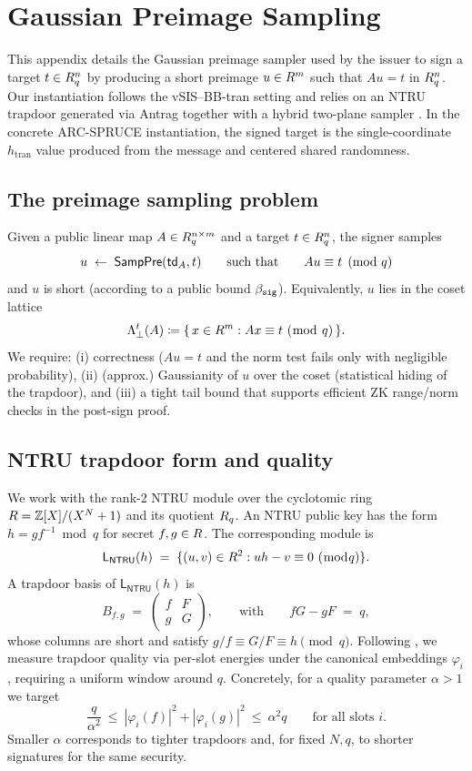 \section{Gaussian Preimage Sampling}
\label{app:gaussian-sampler}

This appendix details the Gaussian preimage sampler used by the issuer to sign a target \(t\in R_q^n\) by producing a
short preimage \(u\in R^m\) such that \(A u = t\) in \(R_q^n\). Our instantiation follows the vSIS--BB-tran
setting \cite{EPRINT:DKLW25} and relies on an NTRU trapdoor generated via Antrag together with a hybrid two-plane
sampler \cite{EPRINT:ENSTW23}. In the concrete ARC-SPRUCE instantiation, the signed target is the single-coordinate
\(h_{\mathrm{tran}}\) value produced from the message and centered shared randomness.

\subsection{The preimage sampling problem}
Given a public linear map \(A\in R_q^{n\times m}\) and a target \(t\in R_q^n\), the signer samples
\[
  u \;\gets\; \mathsf{SampPre}(\mathsf{td}_A,t)
  \qquad\text{such that}\qquad
  A u \equiv t \pmod q
\]
and \(u\) is short (according to a public bound \(\beta_{\mathtt{sig}}\)). Equivalently, \(u\) lies in the coset lattice
\[
  \Lambda_{\perp}^{t}(A)\coloneqq \{\,x\in R^{m} : A x \equiv t\ (\bmod\ q)\,\}.
\]
We require:
(i) correctness (\(Au=t\) and the norm test fails only with negligible probability),
(ii) (approx.) Gaussianity of \(u\) over the coset (statistical hiding of the trapdoor),
and (iii) a tight tail bound that supports efficient ZK range/norm checks in the post-sign proof.

\subsection{NTRU trapdoor form and quality}
\label{subsec:ntru-trapdoor}
We work with the rank-2 NTRU module over the cyclotomic ring \(R=\mathbb{Z}[X]/(X^N+1)\) and its quotient \(R_q\). An NTRU
public key has the form \(h=g f^{-1}\bmod q\) for secret \(f,g\in R\). The corresponding module is
\[
  \mathsf{L}_{\mathsf{NTRU}}(h)
  \;=\;
  \{(u,v)\in R^2 : u h - v \equiv 0 \ (\bmod q)\}.
\]
A trapdoor basis of \(\mathsf{L}_{\mathsf{NTRU}}(h)\) is
\[
  B_{f,g}
  \;=\;
  \begin{pmatrix}
    f & F\\
    g & G
  \end{pmatrix},
  \qquad\text{with}\qquad fG - gF \;=\; q,
\]
whose columns are short and satisfy \(g/f \equiv G/F \equiv h \pmod q\). Following \cite{EPRINT:ENSTW23}, we
measure trapdoor quality via per-slot energies under the canonical embeddings \(\varphi_i\), requiring a uniform window
around \(q\). Concretely, for a quality parameter \(\alpha>1\) we target
\[
  \frac{q}{\alpha^2} \ \le\ |\varphi_i(f)|^2 + |\varphi_i(g)|^2 \ \le\ \alpha^2 q
  \qquad\text{for all slots \(i\)}.
\]
Smaller \(\alpha\) corresponds to tighter trapdoors and, for fixed \(N,q\), to shorter signatures for the same security.

